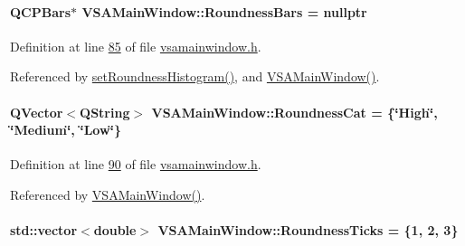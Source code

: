 \paragraph[{Roundness\+Bars}]{\setlength{\rightskip}{0pt plus 5cm}Q\+C\+P\+Bars$\ast$ V\+S\+A\+Main\+Window\+::\+Roundness\+Bars = nullptr\hspace{0.3cm}{\ttfamily [private]}}\label{class_v_s_a_main_window_afe7a5404f6f35af0c40eb277d91b82ac}


Definition at line \hyperlink{vsamainwindow_8h_source_l00085}{85} of file \hyperlink{vsamainwindow_8h_source}{vsamainwindow.\+h}.



Referenced by \hyperlink{vsamainwindow_8cpp_source_l00291}{set\+Roundness\+Histogram()}, and \hyperlink{vsamainwindow_8cpp_source_l00004}{V\+S\+A\+Main\+Window()}.

\hypertarget{class_v_s_a_main_window_a8e54a490d67520e7dedd06addd3eaaa9}{}
\paragraph[{Roundness\+Cat}]{\setlength{\rightskip}{0pt plus 5cm}Q\+Vector$<$Q\+String$>$ V\+S\+A\+Main\+Window\+::\+Roundness\+Cat = \{\char`\"{}High\char`\"{}, \char`\"{}Medium\char`\"{}, \char`\"{}Low\char`\"{}\}\hspace{0.3cm}{\ttfamily [private]}}\label{class_v_s_a_main_window_a8e54a490d67520e7dedd06addd3eaaa9}


Definition at line \hyperlink{vsamainwindow_8h_source_l00090}{90} of file \hyperlink{vsamainwindow_8h_source}{vsamainwindow.\+h}.



Referenced by \hyperlink{vsamainwindow_8cpp_source_l00004}{V\+S\+A\+Main\+Window()}.

\hypertarget{class_v_s_a_main_window_ace4471ce32443a495cd2c2bb500bef7d}{}
\paragraph[{Roundness\+Ticks}]{\setlength{\rightskip}{0pt plus 5cm}std\+::vector$<$double$>$ V\+S\+A\+Main\+Window\+::\+Roundness\+Ticks = \{1, 2, 3\}\hspace{0.3cm}{\ttfamily [private]}}\label{class_v_s_a_main_window_ace4471ce32443a495cd2c2bb500bef7d}


